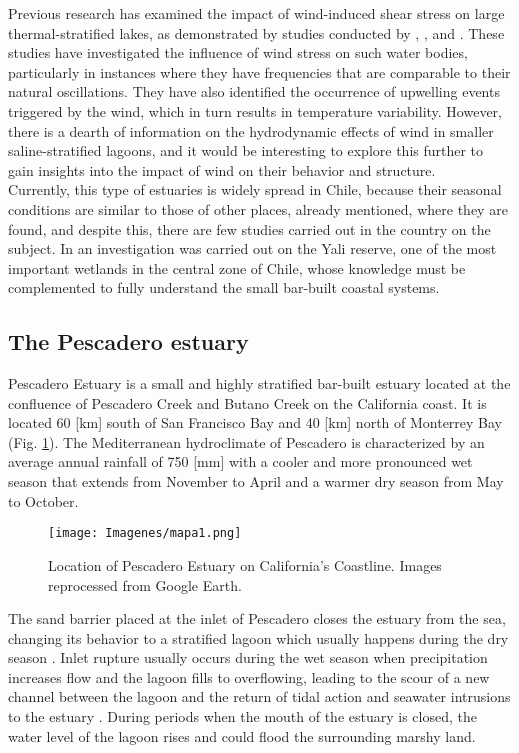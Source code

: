 \documentclass[tesis.tex]{subfiles}
\begin{document}
Previous research has examined the impact of wind-induced shear stress on large thermal-stratified lakes, as demonstrated by studies conducted by \cite{Coman2012}, \cite{Laval2008}, and \cite{avalos2019natural}. These studies have investigated the influence of wind stress on such water bodies, particularly in instances where they have frequencies that are comparable to their natural oscillations. They have also identified the occurrence of upwelling events triggered by the wind, which in turn results in temperature variability. However, there is a dearth of information on the hydrodynamic effects of wind in smaller saline-stratified lagoons, and it would be interesting to explore this further to gain insights into the impact of wind on their behavior and structure.\\

Currently, this type of estuaries is widely spread in Chile, because their seasonal conditions are similar to those of other places, already mentioned, where they are found, and despite this, there are few studies carried out in the country on the subject. In \cite{dussaillant2009} an investigation was carried out on the Yali reserve, one of the most important wetlands in the central zone of Chile, whose knowledge must be complemented to fully understand the small bar-built coastal systems.\\

\subsection{The Pescadero estuary}

Pescadero Estuary is a small and highly stratified bar-built estuary located at the confluence of Pescadero Creek and Butano Creek on the California coast. It is located 60 [km] south of San Francisco Bay and 40 [km] north of Monterrey Bay (Fig. \ref{fig:locPDO}). The Mediterranean hydroclimate of Pescadero is characterized by an average annual rainfall of 750 [mm] with a cooler and more pronounced wet season that extends from November to April and a warmer dry season from May to October.\\

\begin{figure}[h!]
\centering
\texttt{[image: Imagenes/mapa1.png]}
\caption{Location of Pescadero Estuary on California's Coastline. Images reprocessed from Google Earth.}
\label{fig:locPDO}
\end{figure}

The sand barrier placed at the inlet of Pescadero closes the estuary from the sea, changing its behavior to a stratified lagoon which usually happens during the dry season \citep{Williams2014}. Inlet rupture usually occurs during the wet season when precipitation increases flow and the lagoon fills to overflowing, leading to the scour of a new channel between the lagoon and the return of tidal action and seawater intrusions to the estuary \citep{largier2015}. During periods when the mouth of the estuary is closed, the water level of the lagoon rises and could flood the surrounding marshy land. \\
\end{document}
